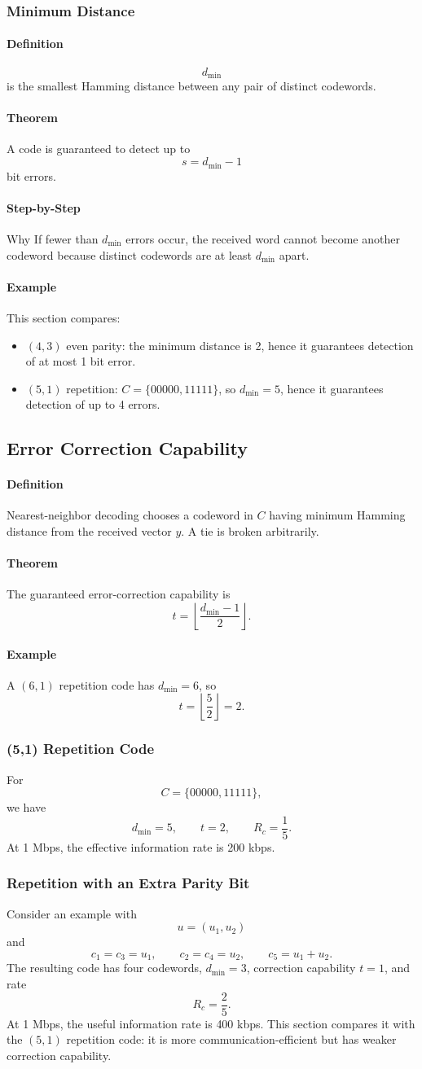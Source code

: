 \documentclass[12pt]{article}
\newcommand{\Definition}{\paragraph{Definition}}
\newcommand{\Step}{\paragraph{Step-by-Step}}
\newcommand{\Example}{\paragraph{Example}}
\newcommand{\Theorem}{\paragraph{Theorem}}
\begin{document}
\subsubsection{Minimum Distance}
\Definition
\[
d_{\min}
\]
is the smallest Hamming distance between any pair of distinct codewords.

\Theorem A code is guaranteed to detect up to
\[
s=d_{\min}-1
\]
bit errors.

\Step{Why}
If fewer than $d_{\min}$ errors occur, the received word cannot become another codeword because distinct codewords are at least $d_{\min}$ apart.

\Example This section compares:
\begin{itemize}
    \item $(4,3)$ even parity: the minimum distance is 2, hence it guarantees detection of at most 1 bit error.
    \item $(5,1)$ repetition: $C=\{00000,11111\}$, so $d_{\min}=5$, hence it guarantees detection of up to 4 errors.
\end{itemize}

\subsection{Error Correction Capability}
\Definition Nearest-neighbor decoding chooses a codeword in $C$ having minimum Hamming distance from the received vector $y$. A tie is broken arbitrarily.

\Theorem The guaranteed error-correction capability is
\[
t=\left\lfloor\frac{d_{\min}-1}{2}\right\rfloor.
\]

\Example A $(6,1)$ repetition code has $d_{\min}=6$, so
\[
t=\left\lfloor\frac{5}{2}\right\rfloor=2.
\]

\subsubsection{(5,1) Repetition Code}
For
\[
C=\{00000,11111\},
\]
we have
\[
d_{\min}=5,
\qquad t=2,
\qquad R_c=\frac15.
\]
At 1 Mbps, the effective information rate is 200 kbps.

\subsubsection{Repetition with an Extra Parity Bit}
Consider an example with
\[
u=(u_1,u_2)
\]
and
\[
c_1=c_3=u_1,
\qquad
c_2=c_4=u_2,
\qquad
c_5=u_1+u_2.
\]
The resulting code has four codewords, $d_{\min}=3$, correction capability $t=1$, and rate
\[
R_c=\frac25.
\]
At 1 Mbps, the useful information rate is 400 kbps. This section compares it with the $(5,1)$ repetition code: it is more communication-efficient but has weaker correction capability.
\end{document}
